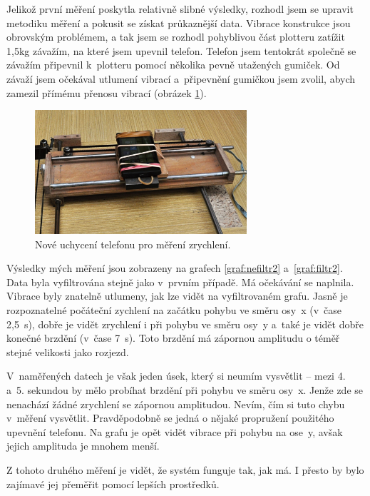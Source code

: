 	Jelikož první měření poskytla relativně slibné výsledky, rozhodl jsem se upravit metodiku měření a pokusit se získat průkaznější data. Vibrace konstrukce jsou obrovským problémem, a tak jsem se rozhodl pohyblivou část plotteru zatížit 1,5kg závažím, na které jsem upevnil telefon. Telefon jsem tentokrát společně se závažím připevnil k~plotteru pomocí několika pevně utažených gumiček. Od závaží jsem očekával utlumení vibrací a~připevnění gumičkou jsem zvolil, abych zamezil přímému přenosu vibrací (obrázek \ref{obr:met2}).
	
	\begin{figure}[h]
			\centering
			\includegraphics[width=0.7\textwidth]{img/metodika2.jpg}
			\caption{Nové uchycení telefonu pro měření zrychlení.}\label{obr:met2}	
	\end{figure}
	
	Výsledky mých měření jsou zobrazeny na grafech \ref{graf:nefiltr2} a~\ref{graf:filtr2}. Data byla vyfiltrována stejně jako v~prvním případě. Má očekávání se naplnila. Vibrace byly znatelně utlumeny, jak lze vidět na vyfiltrovaném grafu. Jasně je rozpoznatelné počáteční zychlení na začátku pohybu ve směru osy~x (v~čase 2,5~s), dobře je vidět zrychlení i při pohybu ve směru osy~y a~také je vidět dobře konečné brzdění (v~čase 7~s). Toto brzdění má zápornou amplitudu o téměř stejné velikosti jako rozjezd.
	
	V~naměřených datech je však jeden úsek, který si neumím vysvětlit -- mezi 4. a~5. sekundou by mělo probíhat brzdění při pohybu ve směru osy~x. Jenže zde se nenachází žádné zrychlení se zápornou amplitudou. Nevím, čím si tuto chybu v~měření vysvětlit. Pravděpodobně se jedná o nějaké propružení použitého upevnění telefonu. Na grafu je opět vidět vibrace při pohybu na ose~y, avšak jejich amplituda je mnohem menší.
	
	Z tohoto druhého měření je vidět, že systém funguje tak, jak má. I přesto by bylo zajímavé jej přeměřit pomocí lepších prostředků.
	
